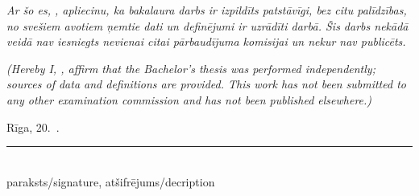 \frontmatterpage
{}
\textit{Ar šo es, \studentnameLV, apliecinu, ka bakalaura darbs ir izpildīts patstāvīgi, bez citu palīdzības, no svešiem avotiem ņemtie dati un definējumi ir uzrādīti darbā. Šis darbs nekādā veidā nav iesniegts nevienai citai pārbaudījuma komisijai un nekur nav publicēts.}

\vspace{12mm}
\noindent \textit{(Hereby I, \studentnameEN, affirm that the Bachelor's thesis was performed independently; sources of data and definitions are provided. This work has not been submitted to any other examination commission and has not been published elsewhere.)}

\vspace{14mm}
\noindent Rīga, 20\underline{\hspace{1cm}}.\ \underline{\hspace{2.5cm}}.\hspace{1cm}\rule{5cm}{0.4pt}\\
\hspace*{7.1cm}\scriptsize paraksts/signature, atšifrējums/decription \hfill

